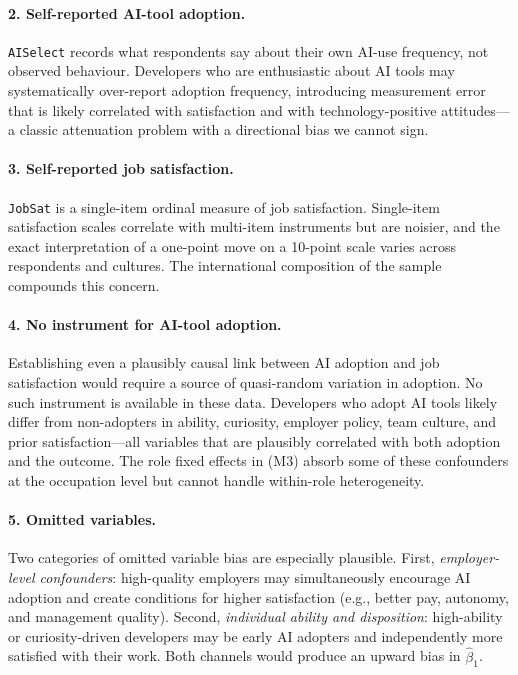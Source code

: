 \documentclass[11pt]{article}
\begin{document}
\paragraph{2. Self-reported AI-tool adoption.}
\texttt{AISelect} records what respondents say about their own AI-use
frequency, not observed behaviour. Developers who are enthusiastic about AI
tools may systematically over-report adoption frequency, introducing
measurement error that is likely correlated with satisfaction and with
technology-positive attitudes---a classic attenuation problem with a
directional bias we cannot sign.

\paragraph{3. Self-reported job satisfaction.}
\texttt{JobSat} is a single-item ordinal measure of job satisfaction.
Single-item satisfaction scales correlate with multi-item instruments
but are noisier, and the exact interpretation of a one-point move on a
10-point scale varies across respondents and cultures. The international
composition of the sample compounds this concern.

\paragraph{4. No instrument for AI-tool adoption.}
Establishing even a plausibly causal link between AI adoption and job
satisfaction would require a source of quasi-random variation in adoption.
No such instrument is available in these data. Developers who adopt AI tools
likely differ from non-adopters in ability, curiosity, employer policy, team
culture, and prior satisfaction---all variables that are plausibly correlated
with both adoption and the outcome. The role fixed effects in (M3) absorb
some of these confounders at the occupation level but cannot handle
within-role heterogeneity.

\paragraph{5. Omitted variables.}
Two categories of omitted variable bias are especially plausible. First,
\textit{employer-level confounders}: high-quality employers may simultaneously
encourage AI adoption and create conditions for higher satisfaction (e.g.,
better pay, autonomy, and management quality). Second, \textit{individual
ability and disposition}: high-ability or curiosity-driven developers may
be early AI adopters and independently more satisfied with their work.
Both channels would produce an upward bias in $\hat\beta_{1}$.
\end{document}
